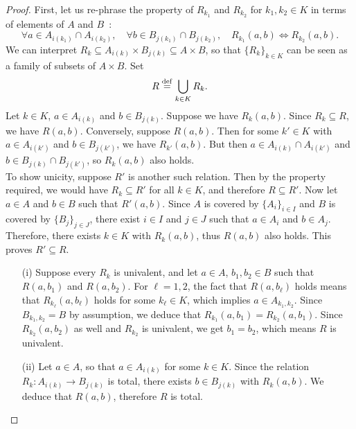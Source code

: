 \begin{proof}
	First, let us re-phrase the property of $R_{k_1}$ and $R_{k_2}$ for $k_1,k_2 \in K$ in terms of elements of $A$ and $B$~:
	\[
		\forall a \in A_{i(k_1)} \cap A_{i(k_2)}, \quad \forall b \in B_{j(k_1)} \cap B_{j(k_2)}, \quad R_{k_1}(a,b) \iff R_{k_2}(a,b).
	\]
	We can interpret $R_k \subseteq A_{i(k)} \times B_{j(k)} \subseteq A \times B$, so that $\{R_k\}_{k \in K}$ can be seen as a family of subsets of $A \times B$. Set
	\[
		R \overset{\mathrm{def}}{=} \bigcup_{k \in K} R_k.	
	\]
	Let $k \in K$, $a \in A_{i(k)}$ and $b \in B_{j(k)}$. Suppose we have $R_k(a,b)$. Since $R_k \subseteq R$, we have $R(a,b)$. Conversely, suppose $R(a,b)$. Then for some $k' \in K$ with $a \in A_{i(k')}$ and $b \in B_{j(k')}$, we have $R_{k'}(a,b)$. But then $a \in A_{i(k)} \cap A_{i(k')}$ and $b \in B_{j(k)} \cap B_{j(k')}$, so $R_k(a,b)$ also holds. 
	\\

	To show unicity, suppose $R'$ is another such relation. Then by the property required, we would have $R_k \subseteq R'$ for all $k \in K$, and therefore $R \subseteq R'$. Now let $a \in A$ and $b \in B$ such that $R'(a,b)$. Since $A$ is covered by $\{A_i\}_{i \in I}$ and $B$ is covered by $\{B_j\}_{j \in J}$, there exist $i \in I$ and $j \in J$ such that $a \in A_i$ and $b \in A_j$. Therefore, there exists $k \in K$ with $R_k(a,b)$, thus $R(a,b)$ also holds. This proves $R' \subseteq R$.
	\\

	\begin{itemize}
		\item[(i)] Suppose every $R_k$ is univalent, and let $a \in A$, $b_1,b_2 \in B$ such that $R(a,b_1)$ and $R(a,b_2)$. For $\ell=1,2$, the fact that $R(a,b_{\ell})$ holds means that $R_{k_{\ell}}(a,b_{\ell})$ holds for some $k_{\ell} \in K$, which implies $a \in A_{k_1,k_2}$. Since $B_{k_1,k_2} = B$ by assumption, we deduce that $R_{k_1}(a,b_1) = R_{k_2}(a,b_1)$. Since $R_{k_2}(a,b_2)$ as well and $R_{k_2}$ is univalent, we get $b_1 = b_2$, which means $R$ is univalent. 
		\\

		\item[(ii)] Let $a \in A$, so that $a \in A_{i(k)}$ for some $k \in K$. Since the relation $R_k : A_{i(k)} \to B_{j(k)}$ is total, there exists $b \in B_{j(k)}$ with $R_k(a,b)$. We deduce that $R(a,b)$, therefore $R$ is total.
 	\end{itemize}
\end{proof}

